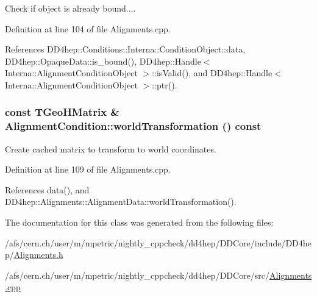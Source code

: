 Check if object is already bound.... 

Definition at line 104 of file Alignments.cpp.

References DD4hep::Conditions::Interna::ConditionObject::data, DD4hep::OpaqueData::is\_\-bound(), DD4hep::Handle$<$ Interna::AlignmentConditionObject $>$::isValid(), and DD4hep::Handle$<$ Interna::AlignmentConditionObject $>$::ptr().\hypertarget{class_d_d4hep_1_1_alignments_1_1_alignment_condition_a4e254e214e4b3b6d60b0db9268d63b3b}{
\subsubsection[{worldTransformation}]{\setlength{\rightskip}{0pt plus 5cm}const TGeoHMatrix \& AlignmentCondition::worldTransformation () const}}
\label{class_d_d4hep_1_1_alignments_1_1_alignment_condition_a4e254e214e4b3b6d60b0db9268d63b3b}


Create cached matrix to transform to world coordinates. 

Definition at line 109 of file Alignments.cpp.

References data(), and DD4hep::Alignments::AlignmentData::worldTransformation().

The documentation for this class was generated from the following files:\begin{DoxyCompactItemize}
\item 
/afs/cern.ch/user/m/mpetric/nightly\_\-cppcheck/dd4hep/DDCore/include/DD4hep/\hyperlink{_alignments_8h}{Alignments.h}\item 
/afs/cern.ch/user/m/mpetric/nightly\_\-cppcheck/dd4hep/DDCore/src/\hyperlink{_alignments_8cpp}{Alignments.cpp}\end{DoxyCompactItemize}
